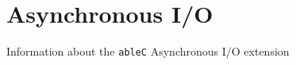 \documentclass[main.tex]{subfiles}
\begin{document}
\section{Asynchronous I/O}
Information about the \verb|ableC| Asynchronous I/O extension
\end{document}
